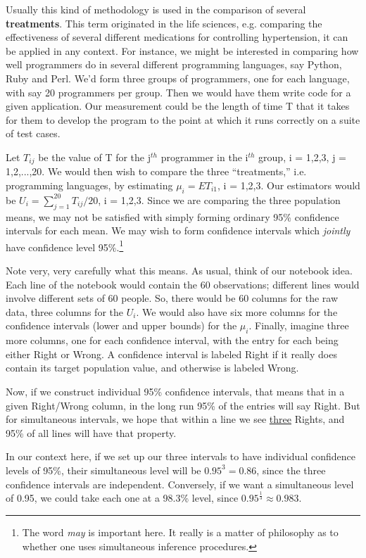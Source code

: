Usually this kind of methodology is used in the comparison of several
{\bf treatments}.  This term originated in the life sciences, e.g.
comparing the effectiveness of several different medications for
controlling hypertension, it can be applied in any context.  For
instance, we might be interested in comparing how well programmers do in
several different programming languages, say Python, Ruby and Perl.
We'd form three groups of programmers, one for each language, with say
20 programmers per group.  Then we would have them write code for a
given application.  Our measurement could be the length of time T that
it takes for them to develop the program to the point at which it runs
correctly on a suite of test cases.  

Let $T_{ij}$ be the value of T for the j$^{th}$ programmer in the
i$^{th}$ group, i = 1,2,3, j = 1,2,...,20.  We would then wish to
compare the three ``treatments,'' i.e. programming languages, by
estimating $\mu_i = ET_{i1}$, i = 1,2,3.  Our estimators would be $U_i =
\sum_{j=1}^{20} T_{ij}/20$, i = 1,2,3.  Since we are comparing the three
population means, we may not be satisfied with simply forming ordinary
95\% confidence intervals for each mean.  We may wish to form confidence
intervals which {\it jointly} have confidence level 95\%.\footnote{The
word {\it may} is important here.  It really is a matter of philosophy
as to whether one uses simultaneous inference procedures.}

Note very, very carefully what this means.  As usual, think of our
notebook idea.  Each line of the notebook would contain the 60
observations; different lines would involve different sets of 60 people.
So, there would be 60 columns for the raw data, three columns for the
$U_i$.  We would also have six more columns for the confidence intervals
(lower and upper bounds) for the $\mu_i$.  Finally, imagine three more
columns, one for each confidence interval, with the entry for each being
either Right or Wrong.  A confidence interval is labeled Right if it
really does contain its target population value, and otherwise is
labeled Wrong.

Now, if we construct individual 95\% confidence intervals, that means
that in a given Right/Wrong column, in the long run 95\% of the entries
will say Right.  But for simultaneous intervals, we hope that within a
line we see \underline{three} Rights, and 95\% of all lines will have
that property.

In our context here, if we set up our three intervals to have individual
confidence levels of 95\%, their simultaneous level will be $0.95^3 =
0.86$, since the three confidence intervals are independent.
Conversely, if we want a simultaneous level of 0.95, we could take each
one at a 98.3\% level, since $0.95^{\frac{1}{3}} \approx 0.983$.

